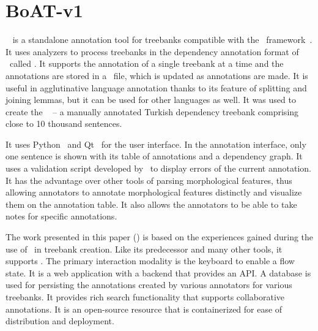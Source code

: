 \section{BoAT-v1}
\label{sec:boatvone}

\boatvone~\cite{turk-etal-2019-turkish} is a standalone annotation tool for treebanks compatible with the \ud\ framework~\cite{UD}.
It uses analyzers to process treebanks in the dependency annotation format of \ud\ called \conllu.
It supports the annotation of a single treebank at a time and the annotations are stored in a \conllu\ file, which is updated as annotations are made.
It is useful in agglutinative language annotation thanks to its feature of splitting and joining lemmas, but it can be used for other languages as well.
It was used to create the \bountreebank~\cite{turk-etal-2019-turkish,turk2021resources,UD-Boun-Treebank} -- a manually annotated Turkish dependency treebank comprising close to 10 thousand sentences.

It uses Python~\cite{python} and Qt~\cite{qt} for the user interface.
In the annotation interface, only one sentence is shown with its table of annotations and a dependency graph.
It uses a validation script developed by \ud\ to display errors of the current annotation.
It has the advantage over other tools of parsing morphological features, thus allowing annotators to annotate morphological features distinctly and visualize them on the annotation table.
It also allows the annotators to be able to take notes for specific annotations.

The work presented in this paper (\boatvtwo) is based on the experiences gained during the use of \boatvone\ in treebank creation.
Like its predecessor and many other tools, it supports \ud.
The primary interaction modality is the keyboard to enable a flow state.
It is a web application with a backend that provides an API.
A database is used for persisting the annotations created by various annotators for various treebanks.
It provides rich search functionality that supports collaborative annotations.
It is an open-source resource that is containerized for ease of distribution and deployment.
